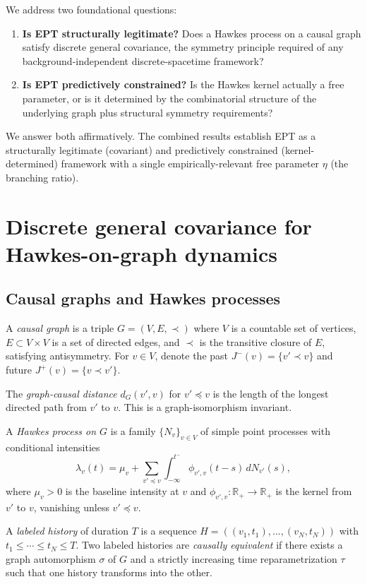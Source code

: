 \documentclass[11pt,a4paper]{article}
\begin{document}
We address two foundational questions:
\begin{enumerate}
\item \textbf{Is EPT structurally legitimate?} Does a Hawkes process on a causal graph satisfy discrete general covariance, the symmetry principle required of any background-independent discrete-spacetime framework?
\item \textbf{Is EPT predictively constrained?} Is the Hawkes kernel actually a free parameter, or is it determined by the combinatorial structure of the underlying graph plus structural symmetry requirements?
\end{enumerate}

We answer both affirmatively. The combined results establish EPT as a structurally legitimate (covariant) and predictively constrained (kernel-determined) framework with a single empirically-relevant free parameter $\eta$ (the branching ratio).

\section{Discrete general covariance for Hawkes-on-graph dynamics}

\subsection{Causal graphs and Hawkes processes}

A \emph{causal graph} is a triple $G = (V, E, \prec)$ where $V$ is a countable set of vertices, $E \subset V \times V$ is a set of directed edges, and $\prec$ is the transitive closure of $E$, satisfying antisymmetry. For $v \in V$, denote the past $J^-(v) = \{v' \prec v\}$ and future $J^+(v) = \{v \prec v'\}$.

The \emph{graph-causal distance} $d_G(v', v)$ for $v' \preceq v$ is the length of the longest directed path from $v'$ to $v$. This is a graph-isomorphism invariant.

A \emph{Hawkes process on $G$} is a family $\{N_v\}_{v \in V}$ of simple point processes with conditional intensities
\begin{equation}
\lambda_v(t) = \mu_v + \sum_{v' \preceq v} \int_{-\infty}^{t^-} \phi_{v',v}(t - s)\, dN_{v'}(s),
\end{equation}
where $\mu_v > 0$ is the baseline intensity at $v$ and $\phi_{v',v}: \mathbb{R}_+ \to \mathbb{R}_+$ is the kernel from $v'$ to $v$, vanishing unless $v' \preceq v$.

A \emph{labeled history} of duration $T$ is a sequence $H = ((v_1, t_1), \ldots, (v_N, t_N))$ with $t_1 \leq \cdots \leq t_N \leq T$. Two labeled histories are \emph{causally equivalent} if there exists a graph automorphism $\sigma$ of $G$ and a strictly increasing time reparametrization $\tau$ such that one history transforms into the other.
\end{document}
